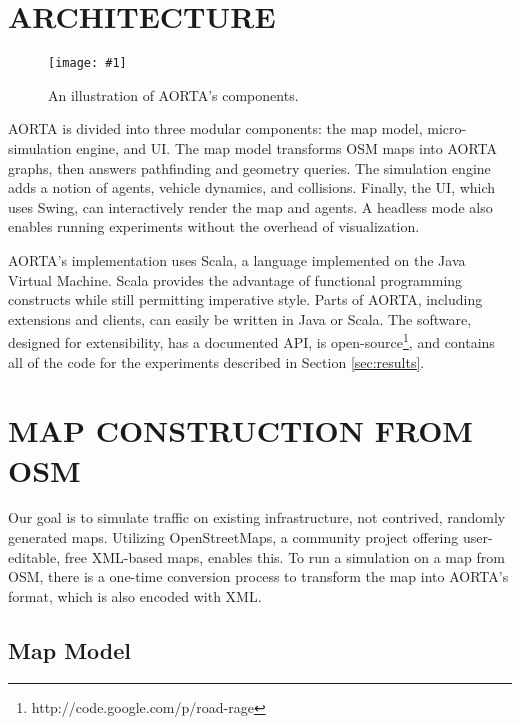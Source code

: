 \documentclass[letterpaper, 10 pt, conference]{ieeeconf}  %
\newcommand{\pix}[3]{
  \begin{figure}[h]
    \centering \texttt{[image: \#1]}
    \caption{#2}
  \end{figure}
}
\begin{document}

\section{ARCHITECTURE}
\label{sec:arch}


\pix{architecture.png}
    {An illustration of AORTA's components.}
    {scale=0.2}

AORTA is divided into three modular components: the map model, micro-simulation
engine, and UI. The map model transforms OSM maps into AORTA graphs, then
answers pathfinding and geometry queries. The simulation engine adds a notion of
agents, vehicle dynamics, and collisions. Finally, the UI, which uses Swing, can
interactively render the map and agents. A headless mode also enables running
experiments without the overhead of visualization.

AORTA's implementation uses Scala, a language implemented on the Java Virtual
Machine. Scala provides the advantage of functional programming constructs while
still permitting imperative style. Parts of AORTA, including extensions and
clients, can easily be written in Java or Scala. The software, designed for
extensibility, has a documented API, is
open-source\footnote{http://code.google.com/p/road-rage}, and contains all of
the code for the experiments described in Section \ref{sec:results}.


\section{MAP CONSTRUCTION FROM OSM}
\label{sec:map}

Our goal is to simulate traffic on existing infrastructure, not contrived,
randomly generated maps. Utilizing OpenStreetMaps, a community project offering
user-editable, free XML-based maps, enables this. To run a simulation on a map
from OSM, there is a one-time conversion process to transform the map into
AORTA's format, which is also encoded with XML.

\subsection{Map Model}
\end{document}
